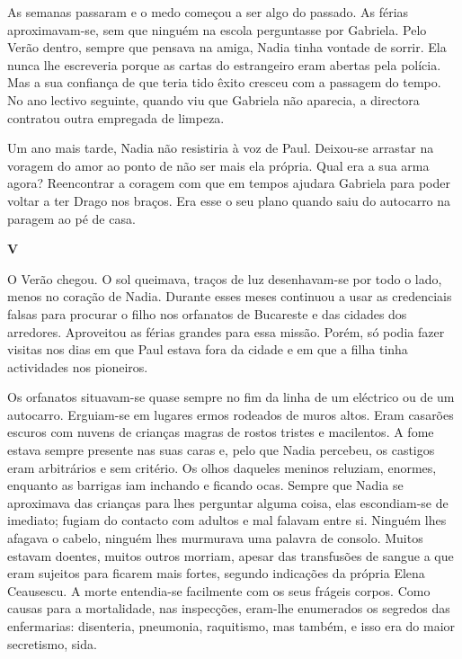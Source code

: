 As semanas passaram e o medo começou a ser algo do passado. As férias
aproximavam-se, sem que ninguém na escola perguntasse por Gabriela. Pelo
Verão dentro, sempre que pensava na amiga, Nadia tinha vontade de
sorrir. Ela nunca lhe escreveria porque as cartas do estrangeiro eram
abertas pela polícia. Mas a sua confiança de que teria tido êxito
cresceu com a passagem do tempo. No ano lectivo seguinte, quando viu que
Gabriela não aparecia, a directora contratou outra empregada de limpeza.

Um ano mais tarde, Nadia não resistiria à voz de Paul. Deixou-se
arrastar na voragem do amor ao ponto de não ser mais ela própria. Qual
era a sua arma agora? Reencontrar a coragem com que em tempos ajudara
Gabriela para poder voltar a ter Drago nos braços. Era esse o seu plano
quando saiu do autocarro na paragem ao pé de casa.


\pagebreak
\vspace*{1.8cm}
\noindent{}\textbf{V}

\bigskip

O Verão chegou. O sol queimava, traços de luz desenhavam-se por todo o
lado, menos no coração de Nadia. Durante esses meses continuou a usar as
credenciais falsas para procurar o filho nos orfanatos de Bucareste e
das cidades dos arredores. Aproveitou as férias grandes para essa
missão. Porém, só podia fazer visitas nos dias em que Paul estava fora
da cidade e em que a filha tinha actividades nos pioneiros.

Os orfanatos situavam-se quase sempre no fim da linha de um eléctrico ou
de um autocarro. Erguiam-se em lugares ermos rodeados de muros altos.
Eram casarões escuros com nuvens de crianças magras de rostos tristes e
macilentos. A fome estava sempre presente nas suas caras e, pelo que
Nadia percebeu, os castigos eram arbitrários e sem critério. Os olhos
daqueles meninos reluziam, enormes, enquanto as barrigas iam inchando e
ficando ocas. Sempre que Nadia se aproximava das crianças para lhes
perguntar alguma coisa, elas escondiam-se de imediato; fugiam do
contacto com adultos e mal falavam entre si. Ninguém lhes afagava o
cabelo, ninguém lhes murmurava uma palavra
de consolo. Muitos estavam doentes, muitos outros morriam, apesar das
transfusões de sangue a que eram sujeitos para ficarem mais fortes,
segundo indicações da própria Elena Ceausescu. A morte entendia-se
facilmente com os seus frágeis corpos. Como causas para a mortalidade,
nas inspecções, eram-lhe enumerados os segredos das enfermarias:
disenteria, pneumonia, raquitismo, mas também, e isso era do maior
secretismo, sida.

